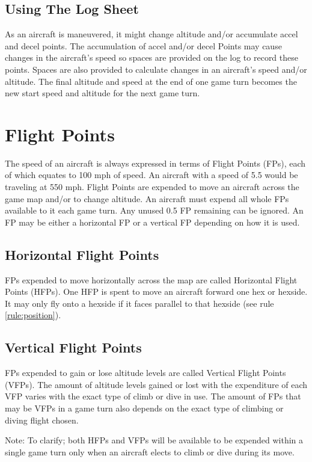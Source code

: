 \subsection{Using The Log Sheet}
As an aircraft is maneuvered, it might change altitude and/or accumulate accel and decel points. The accumulation of accel and/or decel Points may cause changes in the aircraft's speed so spaces are provided on the log to record these points. Spaces are also provided to calculate changes in an aircraft's speed and/or altitude. The final altitude and speed at the end of one game turn becomes the new start speed and altitude for the next game turn.

\section{Flight Points}
\label{rule:flight-points}

The speed of an aircraft is always expressed in terms of Flight Points (FPs), each of which equates to 100 mph of speed. An aircraft with a speed of 5.5 would be traveling at 550 mph. Flight Points are expended to move an aircraft across the game map and/or to change altitude.  An aircraft must expend all whole FPs available to it each game turn. Any unused 0.5 FP remaining can be ignored. An FP may be either a horizontal FP or a vertical FP depending on how it is used.

\subsection{Horizontal Flight Points}
FPs expended to move horizontally across the map are called Horizontal Flight Points (HFPs). One HFP is spent to move an aircraft forward one hex or hexside. It may only fly onto a hexside if it faces parallel to that hexside (see rule \ref{rule:position}).

\subsection{Vertical Flight Points}
FPs expended to gain or lose altitude levels are called Vertical Flight Points (VFPs). The amount of altitude levels gained or lost with the expenditure of each VFP varies with the exact type of climb or dive in use.  The amount of FPs that may be VFPs in a game turn also depends on the exact type of climbing or diving flight chosen.

Note: To clarify; both HFPs and VFPs will be available to be expended within a single game turn only when an aircraft elects to climb or dive during its move.

